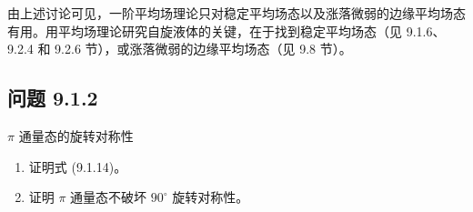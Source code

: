 由上述讨论可见，一阶平均场理论只对稳定平均场态以及涨落微弱的边缘平均场态有用。用平均场理论研究自旋液体的关键，在于找到稳定平均场态（见 9.1.6、9.2.4 和 9.2.6 节），或涨落微弱的边缘平均场态（见 9.8 节）。

\subsection*{问题 9.1.2}

$\pi$ 通量态的旋转对称性

\begin{enumerate}
\item 证明式 (9.1.14)。
\item 证明 $\pi$ 通量态不破坏 $90^{\circ}$ 旋转对称性。
\end{enumerate}

